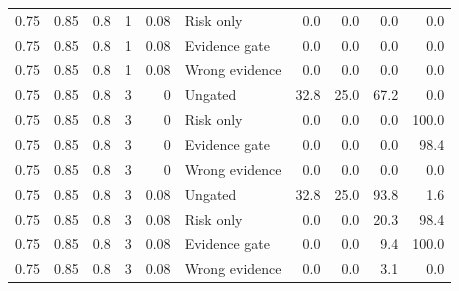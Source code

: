 \begin{longtable}{rrrrrlrrrr}
0.75 & 0.85 & 0.8 & 1 & 0.08 & Risk only & 0.0 & 0.0 & 0.0 & 0.0\\
0.75 & 0.85 & 0.8 & 1 & 0.08 & Evidence gate & 0.0 & 0.0 & 0.0 & 0.0\\
0.75 & 0.85 & 0.8 & 1 & 0.08 & Wrong evidence & 0.0 & 0.0 & 0.0 & 0.0\\
0.75 & 0.85 & 0.8 & 3 & 0 & Ungated & 32.8 & 25.0 & 67.2 & 0.0\\
0.75 & 0.85 & 0.8 & 3 & 0 & Risk only & 0.0 & 0.0 & 0.0 & 100.0\\
0.75 & 0.85 & 0.8 & 3 & 0 & Evidence gate & 0.0 & 0.0 & 0.0 & 98.4\\
0.75 & 0.85 & 0.8 & 3 & 0 & Wrong evidence & 0.0 & 0.0 & 0.0 & 0.0\\
0.75 & 0.85 & 0.8 & 3 & 0.08 & Ungated & 32.8 & 25.0 & 93.8 & 1.6\\
0.75 & 0.85 & 0.8 & 3 & 0.08 & Risk only & 0.0 & 0.0 & 20.3 & 98.4\\
0.75 & 0.85 & 0.8 & 3 & 0.08 & Evidence gate & 0.0 & 0.0 & 9.4 & 100.0\\
0.75 & 0.85 & 0.8 & 3 & 0.08 & Wrong evidence & 0.0 & 0.0 & 3.1 & 0.0\\
\end{longtable}\endgroup